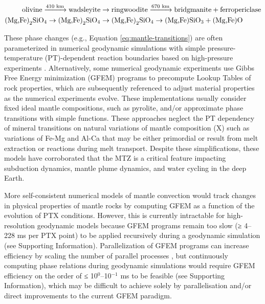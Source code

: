 \documentclass[draft,linenumbers]{agujournal2018}
\begin{document}
\begin{align}
    \text{olivine} \xrightarrow{\text{410 km}} \text{wadsleyite} &\rightarrow \text{ringwoodite} \xrightarrow{\text{670 km}} \text{bridgmanite} + \text{ferropericlase} \notag \\
    \text{(Mg,Fe)}_{2}\text{SiO}_{4} \rightarrow \text{(Mg,Fe)}_{2}\text{SiO}_{4} &\rightarrow \text{(Mg,Fe)}_{2}\text{SiO}_{4} \rightarrow \text{(Mg,Fe)}\text{SiO}_{3} + \text{(Mg,Fe)}\text{O}
    \label{eq:mantle-transitions}
\end{align}

These phase changes (e.g., Equation \eqref{eq:mantle-transitions}) are often parameterized in numerical geodynamic simulations with simple pressure-temperature (PT)-dependent reaction boundaries based on high-pressure experiments \citep[e.g.,][]{agrusta2017, ballmer2015, christensen1995, civzkova2013, kerswell2021, liu1991, nakagawa2005, tackley1994, torii2007}. Alternatively, some numerical geodynamic experiments \citep[e.g.,][]{li2019, yang2020} use Gibbs Free Energy minimization (GFEM) programs \citep[e.g.,][]{connolly2009, riel2022} to precompute Lookup Tables of rock properties, which are subsequently referenced to adjust material properties as the numerical experiments evolve. These implementations usually consider fixed ideal mantle compositions, such as pyrolite, and/or approximate phase transitions with simple functions. These approaches neglect the PT dependency of mineral transitions on natural variations of mantle composition (X) such as variations of Fe-Mg and Al-Ca that may be either primordial or result from melt extraction or reactions during melt transport. Despite these simplifications, these models have corroborated that the MTZ is a critical feature impacting subduction dynamics, mantle plume dynamics, and water cycling in the deep Earth.

More self-consistent numerical models of mantle convection would track changes in physical properties of mantle rocks by computing GFEM as a function of the evolution of PTX conditions. However, this is currently intractable for high-resolution geodynamic models because GFEM programs remain too slow (≥ 4--228 ms per PTX point) to be applied recursively during a geodynamic simulation (see Supporting Information). Parallelization of GFEM programs can increase efficiency by scaling the number of parallel processes \citep{riel2022}, but continuously computing phase relations during geodynamic simulations would require GFEM efficiency on the order of ≤ 10\(^0\)--10\(^{-1}\) ms to be feasible (see Supporting Information), which may be difficult to achieve solely by parallelisation and/or direct improvements to the current GFEM paradigm.
\end{document}
